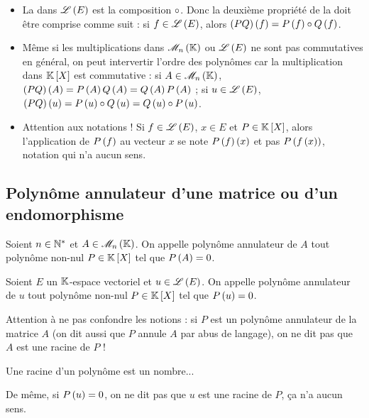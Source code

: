 \begin{rem}
\begin{itemize}
    \item La  dans \(\mathscr{L}\left(E\right)\) est la composition \(\circ\). Donc la deuxième propriété de la  doit être comprise comme suit : si \(f\in\mathscr{L}\left(E\right)\), alors \(\left(PQ\right)\left(f\right)=P\left(f\right)\circ Q\left(f\right)\). \\
    \item Même si les multiplications dans \(\M{n}\) ou \(\mathscr{L}\left(E\right)\) ne sont pas commutatives en général, on peut intervertir l'ordre des polynômes car la multiplication dans \(\poly\) est commutative : si \(A\in\M{n}\), \(\left(PQ\right)\left(A\right)=P\left(A\right)Q\left(A\right)=Q\left(A\right)P\left(A\right)\) ; si \(u\in\mathscr{L}\left(E\right)\), \(\left(PQ\right)\left(u\right)=P\left(u\right)\circ Q\left(u\right)=Q\left(u\right)\circ P\left(u\right)\). \\
    \item Attention aux notations ! Si \(f\in\mathscr{L}\left(E\right)\), \(x\in E\) et \(P\in\poly\), alors l'application de \(P\left(f\right)\) au vecteur \(x\) se note \(P\left(f\right)\left(x\right)\) et pas \(P\left(f\left(x\right)\right)\), notation qui n'a aucun sens.
\end{itemize}
\end{rem}

\subsection{Polynôme annulateur d'une matrice ou d'un endomorphisme}

\begin{defi}
Soient \(n\in\mathbb{N}^*\) et \(A\in\M{n}\). On appelle polynôme annulateur de \(A\) tout polynôme non-nul \(P\in\poly\) tel que \(P\left(A\right)=0\).

Soient \(E\) un \(\mathbb{K}\)-espace vectoriel et \(u\in\mathscr{L}\left(E\right)\). On appelle polynôme annulateur de \(u\) tout polynôme non-nul \(P\in\poly\) tel que \(P\left(u\right)=0\).
\end{defi}

\begin{rem}
Attention à ne pas confondre les notions : si \(P\) est un polynôme annulateur de la matrice \(A\) (on dit aussi que \(P\) annule \(A\) par abus de langage), on ne dit pas que \(A\) est une racine de \(P\) !

Une racine d'un polynôme est un nombre...

De même, si \(P\left(u\right)=0\), on ne dit pas que \(u\) est une racine de \(P\), ça n'a aucun sens.
\end{rem}

